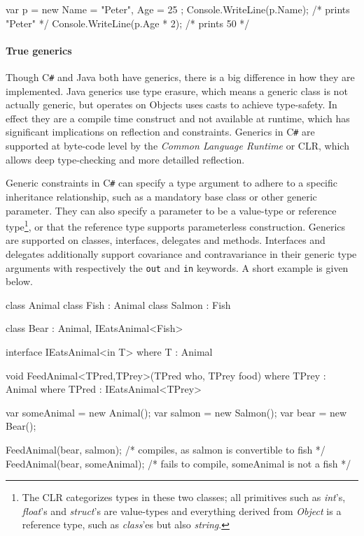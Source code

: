 \documentclass[twoside,openright]{uva-bachelor-thesis}
\newcommand{\code}[1]{\texttt{\footnotesize#1}}
\newcommand{\cs}{C\texttt{\#}\xspace}
\begin{document}
			\begin{codespan}
				\begin{csharpcode}
					var p = new { Name = "Peter", Age = 25 };
					Console.WriteLine(p.Name);       /* prints "Peter" */
					Console.WriteLine(p.Age * 2);    /* prints 50 */
				\end{csharpcode}
			\end{codespan}
								
		\paragraph{True generics}
			Though \cs and Java both have generics, there is a big difference in how they are implemented. Java generics use type erasure, which means a generic class is not actually generic, but operates on Objects uses casts to achieve type-safety. In effect they are a compile time construct and not available at runtime, which has significant implications on reflection and constraints. Generics in \cs are supported at byte-code level by the \emph{Common Language Runtime} or CLR, which allows deep type-checking and more detailled reflection\cite{website:java-generics}.
			
			Generic constraints in \cs can specify a type argument to adhere to a specific inheritance relationship, such as a mandatory base class or other generic parameter. They can also specify a parameter to be a value-type or reference type\footnote{The CLR categorizes types in these two classes; all primitives such as \emph{int}'s, \emph{float}'s and \emph{struct}'s are value-types and everything derived from \emph{Object} is a reference type, such as \emph{class}'es but also \emph{string}.}, or that the reference type supports parameterless construction. Generics are supported on classes, interfaces, delegates and methods. Interfaces and delegates additionally support covariance and contravariance in their generic type arguments with respectively the \code{out} and \code{in} keywords. A short example is given below.
			
			\begin{codespan}
				\begin{csharpcode}
					class Animal { }
					class Fish : Animal { }
					class Salmon : Fish { }
					
					class Bear : Animal, IEatsAnimal<Fish> { }
					
					interface IEatsAnimal<in T>
						where T : Animal
					{
					}
					
					void FeedAnimal<TPred,TPrey>(TPred who, TPrey food)
						where TPrey : Animal
						where TPred : IEatsAnimal<TPrey>
					{
					}
					
					var someAnimal = new Animal();
					var salmon = new Salmon();
					var bear = new Bear();
					
					FeedAnimal(bear, salmon);      /* compiles, as salmon is convertible to fish */
					FeedAnimal(bear, someAnimal);  /* fails to compile, someAnimal is not a fish */
				\end{csharpcode}
			\end{codespan}
			
\end{document}
